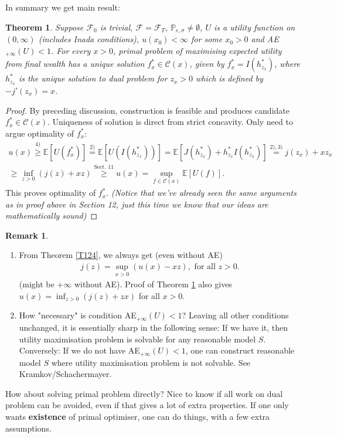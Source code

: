 \documentclass[12pt,a4paper, twoside]{article}
\newtheorem{thm}{Theorem}[section]
\theoremstyle{definition}
\newtheorem{rem}{Remark}[section]
\newcommand{\EE}{\mathbb{E}} %
\newcommand{\PP}{\mathbb{P}} %
\begin{document}
In summary we get main result:
\begin{thm} \label{T131} Suppose $\mathcal{F}_0$ is trivial, $\mathcal{F}= \mathcal{F}_T$, $\PP_{e, \sigma} \neq \emptyset$, $U$ is a utility function on $(0, \infty)$ (includes Inada conditions), $u(x_0) < \infty$ for some $x_0 >0$ and AE$_{+ \infty}(U) <1$. For every $x>0$, primal problem of maximising expected utility from final wealth has a unique solution $f_x^* \in \mathcal{C}(x)$, given by $f_x^*=I(h_{z_x}^*)$, where $h_{z_x}^*$ is the unique solution to dual problem for $z_x>0$ which is defined by $-j'(z_x)=x$. 
\end{thm}
\begin{proof}
By preceding  discussion, construction is feasible and produces candidate $f_x^* \in \mathcal{C}(x)$. Uniqueness of solution is direct from strict concavity. Only need to argue optimality of $f_x^*$: 
\begin{align*}
u(x) \overset{4)}\geq \EE[U(f_x^*)] \overset{2)}= \EE[U(I(h_{z_x}^*))] = \EE[J(h_{z_x}^*) + h_{z_x}^*I(h_{z_x}^*)] \overset{2),3)}= j(z_x) + xz_x \\ \geq \inf_{z >0} (j(z) + xz) \overset{\text{Sect. 11}}\geq u(x) = \sup_{f \in \mathcal{C}(x)} \EE[U(f)].
\end{align*}
This proves optimality of $f_x^*$. \textit{(Notice that we've already seen the same arguments as in proof above in Section 12, just this time we know that our ideas are mathematically sound)}
\end{proof}
\begin{rem} \
\begin{enumerate}
\item From Theorem \ref{T124}, we always get (even without AE) 
\begin{align*}
j(z)= \sup_{x >0} (u(x)-xz), \text{ for all } z>0.
\end{align*}
(might be $+ \infty$ without AE). Proof of Theorem \ref{T131} also gives $u(x) = \inf_{z >0} (j(z) + zx)$ for all $x>0$. 
\item How "necessary" is condition AE$_{+ \infty}(U) <1$? Leaving all other conditions unchanged, it is essentially sharp in the following sense: If we have it, then utility maximisation problem is solvable for any reasonable model $S$. Conversely: If we do not have AE$_{+ \infty}(U)<1$, one can construct reasonable model $S$ where utility maximisation problem is not solvable. See Kramkov/Schachermayer.
\end{enumerate}
\end{rem}
How about solving primal problem directly? Nice to know if all work on dual problem can be avoided, even if that gives a lot of extra properties. If one only wants \textbf{existence} of primal optimiser, one can do things, with a few extra assumptions.
\end{document}
